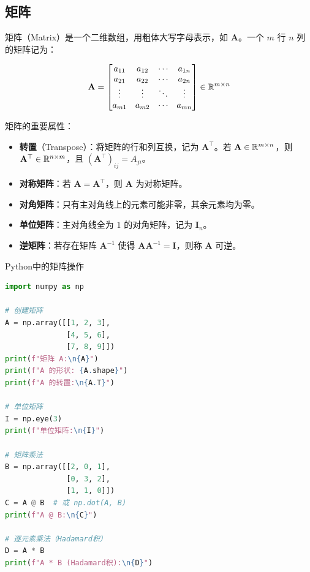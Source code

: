 \subsection{矩阵}

矩阵（Matrix）是一个二维数组，用粗体大写字母表示，如 $\mathbf{A}$。一个 $m$ 行 $n$ 列的矩阵记为：

\[
\mathbf{A} = \begin{bmatrix}
a_{11} & a_{12} & \cdots & a_{1n} \\
a_{21} & a_{22} & \cdots & a_{2n} \\
\vdots & \vdots & \ddots & \vdots \\
a_{m1} & a_{m2} & \cdots & a_{mn}
\end{bmatrix} \in \mathbb{R}^{m\times n}
\]

矩阵的重要属性：
\begin{itemize}
    \item \textbf{转置}（Transpose）：将矩阵的行和列互换，记为 $\mathbf{A}^{\top}$。若 $\mathbf{A}\in\mathbb{R}^{m\times n}$，则 $\mathbf{A}^{\top}\in\mathbb{R}^{n\times m}$，且 $(\mathbf{A}^{\top})_{ij}=A_{ji}$。
    \item \textbf{对称矩阵}：若 $\mathbf{A}=\mathbf{A}^{\top}$，则 $\mathbf{A}$ 为对称矩阵。
    \item \textbf{对角矩阵}：只有主对角线上的元素可能非零，其余元素均为零。
    \item \textbf{单位矩阵}：主对角线全为 $1$ 的对角矩阵，记为 $\mathbf{I}_n$。
    \item \textbf{逆矩阵}：若存在矩阵 $\mathbf{A}^{-1}$ 使得 $\mathbf{A}\mathbf{A}^{-1}=\mathbf{I}$，则称 $\mathbf{A}$ 可逆。
\end{itemize}

\begin{mycode}{Python中的矩阵操作}
\begin{lstlisting}[language=Python]
import numpy as np

# 创建矩阵
A = np.array([[1, 2, 3],
              [4, 5, 6],
              [7, 8, 9]])
print(f"矩阵 A:\n{A}")
print(f"A 的形状: {A.shape}")
print(f"A 的转置:\n{A.T}")

# 单位矩阵
I = np.eye(3)
print(f"单位矩阵:\n{I}")

# 矩阵乘法
B = np.array([[2, 0, 1],
              [0, 3, 2],
              [1, 1, 0]])
C = A @ B  # 或 np.dot(A, B)
print(f"A @ B:\n{C}")

# 逐元素乘法（Hadamard积）
D = A * B
print(f"A * B (Hadamard积):\n{D}")
\end{lstlisting}
\end{mycode}


